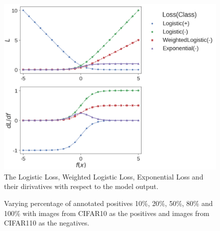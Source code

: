 \begin{figure}[t]
\centering
   \includegraphics[width=0.95\linewidth]{img/losses.png}
\caption{The Logistic Loss, Weighted Logistic Loss, Exponential Loss and their dirivatives with respect to the model output.}
\label{fig:losses}
\end{figure}


\begin{figure}[t]
\centering
\fbox{\rule{0pt}{2in} \rule{0.9\linewidth}{0pt}}
\caption{Varying percentage of annotated positives 10\%, 20\%, 50\%, 80\% and 100\% with images from CIFAR10 as the positives and images from CIFAR110 as the negatives.}
\label{fig:pct_annotating}
\end{figure}

